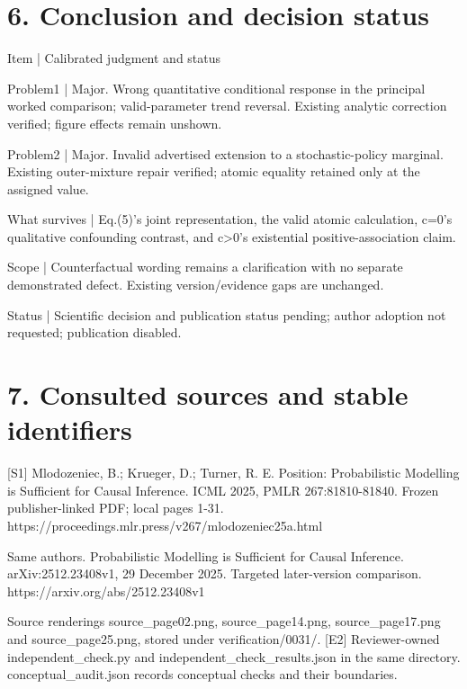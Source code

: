 \documentclass[10pt]{article}
\begin{document}
\section*{6. Conclusion and decision status}
Item | Calibrated judgment and status\par
Problem1 | Major. Wrong quantitative conditional response in the principal worked comparison; valid-parameter trend reversal. Existing analytic correction verified; figure effects remain unshown.\par
Problem2 | Major. Invalid advertised extension to a stochastic-policy marginal. Existing outer-mixture repair verified; atomic equality retained only at the assigned value.\par
What survives | Eq.(5)’s joint representation, the valid atomic calculation, c=0’s qualitative confounding contrast, and c>0’s existential positive-association claim.\par
Scope | Counterfactual wording remains a clarification with no separate demonstrated defect. Existing version/evidence gaps are unchanged.\par
Status | Scientific decision and publication status pending; author adoption not requested; publication disabled.\par
\section*{7. Consulted sources and stable identifiers}
[S1] Mlodozeniec, B.; Krueger, D.; Turner, R. E. Position: Probabilistic Modelling is Sufficient for Causal Inference. ICML 2025, PMLR 267:81810-81840. Frozen publisher-linked PDF; local pages 1-31. https://proceedings.mlr.press/v267/mlodozeniec25a.html\par
Same authors. Probabilistic Modelling is Sufficient for Causal Inference. arXiv:2512.23408v1, 29 December 2025. Targeted later-version comparison. https://arxiv.org/abs/2512.23408v1\par
Source renderings source\_page02.png, source\_page14.png, source\_page17.png and source\_page25.png, stored under verification/0031/. [E2] Reviewer-owned independent\_check.py and independent\_check\_results.json in the same directory. conceptual\_audit.json records conceptual checks and their boundaries.\par
\end{document}
